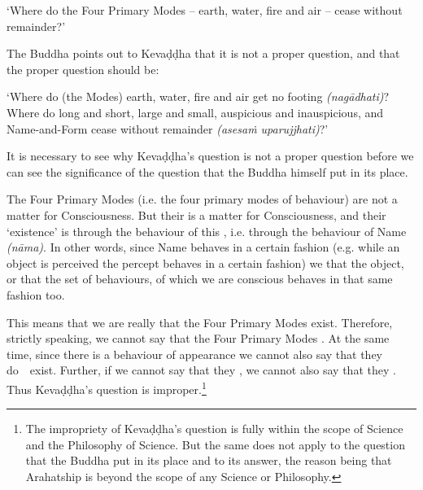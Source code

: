 `Where do the Four Primary Modes -- earth, water, fire and air -- cease without remainder?'

The Buddha points out to Kevaḍḍha that it is not a proper question, and that the proper question should be:

`Where do (the Modes) earth, water, fire and air get no footing \emph{(nagādhati)}? Where do long and short, large and small, auspicious and inauspicious, and Name-and-Form cease without remainder \emph{(asesaṁ uparujjhati)}?'

It is necessary to see why Kevaḍḍha's question is not a proper question before we can see the significance of the question that the Buddha himself put in its place.

\protect\hypertarget{the-four-primary}{}{}The Four Primary Modes (i.e. the four primary modes of behaviour)  are not a matter for Consciousness. But their  is a matter for Consciousness, and their `existence' is  through the behaviour of this , i.e. through the behaviour of Name \emph{(nāma)}. In other words, since Name behaves in a certain fashion (e.g. while an object is perceived the percept behaves in a certain fashion) we  that the object, or that the set of behaviours, of which we are conscious behaves in that same fashion too.

This means that we are really  that the Four Primary Modes exist. Therefore, strictly speaking, we cannot say that the Four Primary Modes . At the same time, since there is a behaviour of appearance we cannot also say that they do~~exist. Further, if we cannot say that they , we cannot also say that they . Thus Kevaḍḍha's question is improper.\footnote{The impropriety of Kevaḍḍha's question is fully within the scope of Science and the Philosophy of Science. But the same does not apply to the question that the Buddha put in its place and to its answer, the reason being that Arahatship is beyond the scope of any Science or Philosophy.}

